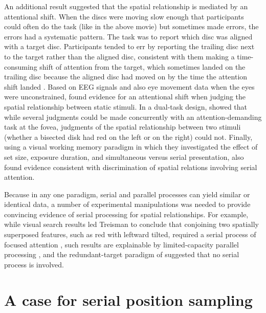 \documentclass[
]{book}
\begin{document}
An additional result suggested that the spatial relationship is mediated by an attentional shift. When the discs were moving slow enough that participants could often do the task (like in the above movie) but sometimes made errors, the errors had a systematic pattern. The task was to report which disc was aligned with a target disc. Participants tended to err by reporting the trailing disc next to the target rather than the aligned disc, consistent with them making a time-consuming shift of attention from the target, which sometimes landed on the trailing disc because the aligned disc had moved on by the time the attention shift landed \citep{holcombePerceivingSpatialRelations2011}. Based on EEG signals and also eye movement data when the eyes were unconstrained, \citet{franconeriFlexibleVisualProcessing2012} found evidence for an attentional shift when judging the spatial relationship between static stimuli. In a dual-task design, \citet{leeAttentionalCapacityUndifferentiated1999} showed that while several judgments could be made concurrently with an attention-demanding task at the fovea, judgments of the spatial relationship between two stimuli (whether a bisected disk had red on the left or on the right) could not. Finally, using a visual working memory paradigm in which they investigated the effect of set size, exposure duration, and simultaneous versus serial presentation, \citet{smithAttentionweightedSamplesizeModel2016} also found evidence consistent with discrimination of spatial relations involving serial attention.

Because in any one paradigm, serial and parallel processes can yield similar or identical data, a number of experimental manipulations was needed to provide convincing evidence of serial processing for spatial relationships. For example, while visual search results led Treisman to conclude that conjoining two spatially superposed features, such as red with leftward tilted, required a serial process of focused attention \citep{treismanFeatureIntegrationTheory1980}, such results are explainable by limited-capacity parallel processing \citep{palmerAttentionVisualSearch1995}, and the redundant-target paradigm of \citet{thorntonParallelSerialProcesses2007} suggested that no serial process is involved.

\hypertarget{a-case-for-serial-position-sampling}{%
\section{A case for serial position sampling}\label{a-case-for-serial-position-sampling}}
\end{document}
